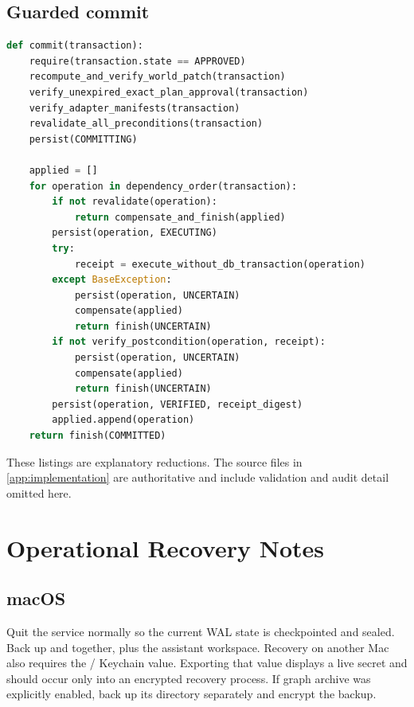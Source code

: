 \subsection{Guarded commit}

\begin{lstlisting}[language=Python]
def commit(transaction):
    require(transaction.state == APPROVED)
    recompute_and_verify_world_patch(transaction)
    verify_unexpired_exact_plan_approval(transaction)
    verify_adapter_manifests(transaction)
    revalidate_all_preconditions(transaction)
    persist(COMMITTING)

    applied = []
    for operation in dependency_order(transaction):
        if not revalidate(operation):
            return compensate_and_finish(applied)
        persist(operation, EXECUTING)
        try:
            receipt = execute_without_db_transaction(operation)
        except BaseException:
            persist(operation, UNCERTAIN)
            compensate(applied)
            return finish(UNCERTAIN)
        if not verify_postcondition(operation, receipt):
            persist(operation, UNCERTAIN)
            compensate(applied)
            return finish(UNCERTAIN)
        persist(operation, VERIFIED, receipt_digest)
        applied.append(operation)
    return finish(COMMITTED)
\end{lstlisting}

These listings are explanatory reductions. The source files in \cref{app:implementation} are authoritative and include validation and audit detail omitted here.

\section{Operational Recovery Notes}
\label{app:recovery}

\subsection{macOS}

Quit the service normally so the current WAL state is checkpointed and sealed. Back up  and  together, plus the assistant workspace. Recovery on another Mac also requires the / Keychain value. Exporting that value displays a live secret and should occur only into an encrypted recovery process. If graph archive was explicitly enabled, back up its directory separately and encrypt the backup.

